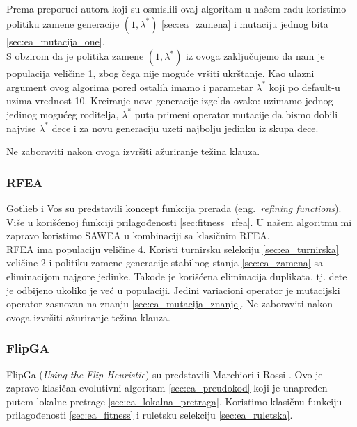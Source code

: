 \documentclass{article}
\begin{document}
Prema preporuci autora koji su osmislili ovaj algoritam u našem radu koristimo politiku zamene generacije $(1,\lambda^*)$ \ref{sec:ea_zamena} i mutaciju jednog bita \ref{sec:ea_mutacija_one}.\\

S obzirom da je politika zamene  $(1,\lambda^*)$ iz ovoga zaključujemo da nam je populacija veličine 1, zbog čega nije moguće vršiti ukrštanje. 
Kao ulazni argument ovog algorima pored ostalih imamo i parametar $\lambda^*$ koji po default-u uzima vrednost 10. Kreiranje nove generacije izgelda ovako: uzimamo jednog jedinog mogućeg roditelja, $\lambda^*$ puta primeni operator mutacije da bismo dobili najvise $\lambda^*$ dece i za novu generaciju uzeti najbolju jedinku iz skupa dece.

Ne zaboraviti nakon ovoga izvršiti ažuriranje težina klauza.


\subsubsection{RFEA}
\label{sec:ea_rfea}
Gotlieb i Vos \cite{ea_with_table, ea_without_table} su predstavili koncept funkcija prerada (eng.~{\em refining functions}). Više u korišćenoj funkciji prilagođenosti \ref{sec:fitness_rfea}.
U našem algoritmu mi zapravo koristimo SAWEA u kombinaciji sa klasičnim RFEA. \\

RFEA ima populaciju veličine 4. Koristi turnirsku selekciju \ref{sec:ea_turnirska} veličine 2 i politiku zamene generacije stabilnog stanja \ref{sec:ea_zamena} sa eliminacijom najgore jedinke. Takođe je korišćena eliminacija duplikata, tj. dete je odbijeno ukoliko je već u populaciji.
Jedini variacioni operator je mutacijski operator zasnovan na znanju \ref{sec:ea_mutacija_znanje}.
Ne zaboraviti nakon ovoga izvršiti ažuriranje težina klauza.


\subsubsection{FlipGA}
\label{sec:ea_flipga}
FlipGa (\textit{Using the Flip Heuristic}) su predstavili Marchiori i Rossi \cite{ea_with_table}. Ovo je zapravo klasičan evolutivni algoritam \ref{sec:ea_preudokod}  koji je unapređen putem lokalne pretrage \ref{sec:ea_lokalna_pretraga}. Koristimo klasičnu funkciju prilagođenosti \ref{sec:ea_fitness} i ruletsku selekciju \ref{sec:ea_ruletska}. \\
\end{document}
